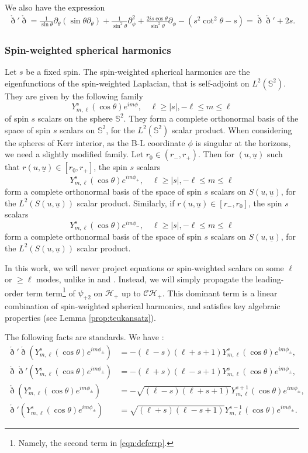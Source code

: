 \documentclass[reqno]{amsart}
\numberwithin{equation}{section}
\newcommand{\mch}{\mathcal{H}}
\newcommand{\ubar}{{\underline{u}}}
\newcommand{\ch}{\mathcal{CH_+}}
\newcommand{\drond}{\mathring{\eth}}
\newcommand{\psip}{\psi_{+2}}
\newcommand{\sph}{\mathbb S}
\theoremstyle{plain}
\theoremstyle{definition}
\theoremstyle{remark}
\numberwithin{equation}{section}
\begin{document}
\begin{rem}
    We also have the expression
        \begin{align}
        \drond'\drond=\frac{1}{\sin\theta}\partial_\theta(\sin\theta\partial_\theta)+\frac{1}{\sin^2\theta}\partial_\phi^2+\frac{2is\cos\theta}{\sin^2\theta}\partial_\phi-(s^2\cot^2\theta-s)=\drond\drond'+2s.
    \end{align}
\end{rem}
\subsubsection{Spin-weighted spherical harmonics}\label{section:spinweightedspherical}
Let $s$ be a fixed spin. The spin-weighted spherical harmonics are the eigenfunctions of the spin-weighted Laplacian, that is self-adjoint on $L^2(\sph^2)$. They are given by the following family
$$Y_{m,\ell}^s(\cos\theta)e^{im\phi},\quad\ell\geq |s|, -\ell\leq m\leq \ell$$
of spin $s$ scalars on the sphere $\sph^2$. They form a complete orthonormal basis of the space of spin $s$ scalars on $\sph^2$, for the $L^2(\sph^2)$ scalar product. When considering the spheres of Kerr interior, as the B-L coordinate $\phi$ is singular at the horizons, we need a slightly modified family. Let $r_0\in(r_-,r_+)$. Then for $(u,\ubar)$ such that $r(u,\ubar)\in [r_0,r_+]$, the spin $s$ scalars 
$$Y_{m,\ell}^s(\cos\theta)e^{im\phi_+},\quad\ell\geq |s|, -\ell\leq m\leq \ell$$
form a complete orthonormal basis of the space of spin $s$ scalars on $S(u,\ubar)$, for the $L^2(S(u,\ubar))$ scalar product. Similarly, if $r(u,\ubar)\in [r_-,r_0]$, the spin $s$ scalars 
$$Y_{m,\ell}^s(\cos\theta)e^{im\phi_-},\quad\ell\geq |s|, -\ell\leq m\leq \ell$$
form a complete orthonormal basis of the space of spin $s$ scalars on $S(u,\ubar)$, for the $L^2(S(u,\ubar))$ scalar product.

\begin{rem}
    In this work, we will never project equations or spin-weighted scalars on some $\ell$ or $\geq\ell$ modes, unlike in \cite{scalarMZ} and \cite{pricelaw}. Instead, we will simply propagate the leading-order term term\footnote{Namely, the second term in \eqref{eqn:deferrp}.} of $\psip$ on $\mch_+$ up to $\ch$. This dominant term is a linear combination of spin-weighted spherical harmonics, and satisfies key algebraic properties (see Lemma \ref{prop:teukansatz}).
\end{rem}
The following facts are standards. We have :
\begin{align}
    \drond'\drond(Y_{m,\ell}^s(\cos\theta)e^{im\phi_\pm})&=-(\ell-s)(\ell+s+1)Y_{m,\ell}^s(\cos\theta)e^{im\phi_\pm},\label{eq:vpspin}\\
    \drond\drond'(Y_{m,\ell}^s(\cos\theta)e^{im\phi_\pm})&=-(\ell+s)(\ell-s+1)Y_{m,\ell}^s(\cos\theta)e^{im\phi_\pm},\label{eqn:annulemode}\\
    \drond(Y_{m,\ell}^{s}(\cos\theta)e^{im\phi_\pm})&=-\sqrt{(\ell-s)(\ell+s+1)}Y_{m,\ell}^{s+1}(\cos\theta)e^{im\phi_\pm},\label{eqn:drooo}\\
    \drond'(Y_{m,\ell}^s(\cos\theta)e^{im\phi_\pm})&=\sqrt{(\ell+s)(\ell-s+1)}Y_{m,\ell}^{s-1}(\cos\theta)e^{im\phi_\pm}.
\end{align}
\end{document}
